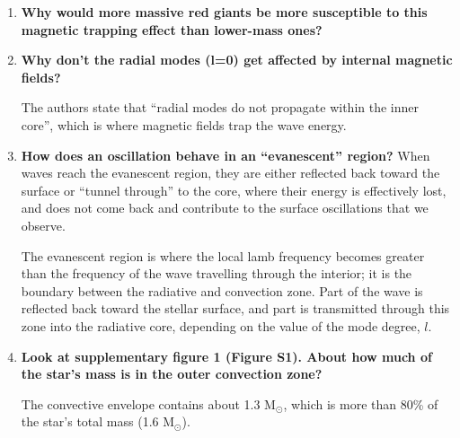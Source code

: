 \documentclass[11pt]{article}
\begin{document}
\begin{enumerate}
    \item \textbf{Why would more massive red giants be more susceptible to this
        magnetic trapping effect than lower-mass ones?}

    \item \textbf{Why don't the radial modes (l=0) get affected by internal
        magnetic fields?}

        The authors state that ``radial modes do not propagate within the inner core'',
        which is where magnetic fields trap the wave energy.

    \item \textbf{How does an oscillation behave in an ``evanescent'' region?}
        When waves reach the evanescent region, they are either reflected back
        toward the surface or ``tunnel through'' to the core, where their energy
        is effectively lost, and does not come back and contribute to the surface
        oscillations that we observe.

        The evanescent region is where the local lamb frequency becomes greater than
        the frequency of the wave travelling through the interior; it is the boundary
        between the radiative and convection zone. Part of the wave is reflected back
        toward the stellar surface, and part is transmitted through this zone into
        the radiative core, depending on the value of the mode degree, $l$.


    \item \textbf{Look at supplementary figure 1 (Figure S1). About how much of the
        star's mass is in the outer convection zone?}

        The convective envelope contains about 1.3 M$_{\odot}$, which
        is more than 80\% of the star's total mass (1.6 M$_{\odot}$).

\end{enumerate}
\end{document}
